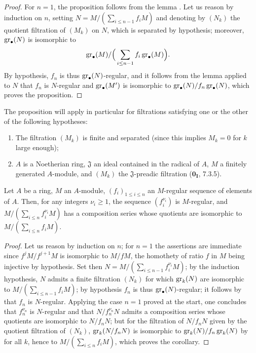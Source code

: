 \begin{proof}
For $n=1$, the proposition follows from the lemma .
Let us reason by induction on $n$, setting $N=M/(\sum_{i\leq n-1}f_iM)$ and denoting by $(N_k)$ the quotient filtration of $(M_k)$ on $N$, which is separated by hypothesis;
moreover, $\operatorname{gr}_\bullet(N)$ is isomorphic to
\[
  \operatorname{gr}_\bullet(M)/\Big(\sum_{i\leq n-1}f_i\operatorname{gr}_\bullet(M)\Big).
\]
By hypothesis, $f_n$ is thus $\operatorname{gr}_\bullet(N)$-regular, and it follows from the lemma  applied to $N$ that $f_n$ is $N$-regular and $\operatorname{gr}_\bullet(M')$ is isomorphic to $\operatorname{gr}_\bullet(N)/f_n\operatorname{gr}_\bullet(N)$, which proves the proposition.
\end{proof}

The proposition  will apply in particular for filtrations satisfying one or the other of the following hypotheses:
\begin{enumerate}
  \item[$1^\circ$] The filtration $(M_k)$ is finite and separated (since this implies $M_k=0$ for $k$ large enough);
  \item[$2^\circ$] $A$ is a Noetherian ring, $\mathfrak{J}$ an ideal contained in the radical of $A$, $M$ a finitely generated $A$-module, and $(M_k)$ the $\mathfrak{J}$-preadic filtration ($\mathbf{0_I}$, 7.3.5).
\end{enumerate}

\begin{corollary}[15.1.20]
\label{0.15.1.20}
Let $A$ be a ring, $M$ an $A$-module, $(f_i)_{1\leq i\leq n}$ an $M$-regular sequence of elements of $A$.
Then, for any integers $\nu_i\geq 1$, the sequence $(f_i^{\nu_i})$ is $M$-regular, and $M/(\sum_{i\leq n}f_i^{\nu_i}M)$ has a composition series whose quotients are isomorphic to $M/(\sum_{i\leq n}f_iM)$.
\end{corollary}

\begin{proof}
Let us reason by induction on $n$;
for $n=1$ the assertions are immediate since $f^jM/f^{j+1}M$ is isomorphic to $M/fM$, the homothety of ratio $f$ in $M$ being injective by hypothesis.
Set then $N=M/(\sum_{i\leq n-1}f_i^{\nu_i}M)$;
by the induction hypothesis, $N$ admits a finite filtration $(N_k)$ for which $\operatorname{gr}_k(N)$ are isomorphic to $M/(\sum_{i\leq n-1}f_iM)$;
by hypothesis $f_n$ is thus $\operatorname{gr}_\bullet(N)$-regular;
it follows by  that $f_n$ is $N$-regular.
Applying the case $n=1$ proved at the start, one concludes that $f_n^{\nu_n}$ is $N$-regular and that $N/f_n^{\nu_n}N$ admits a composition series whose quotients are isomorphic to $N/f_nN$;
but for the filtration of $N/f_nN$ given by the quotient filtration of $(N_k)$, $\operatorname{gr}_k(N/f_nN)$ is isomorphic to $\operatorname{gr}_k(N)/f_n\operatorname{gr}_k(N)$ by  for all $k$, hence to $M/(\sum_{i\leq n}f_iM)$, which proves the corollary.
\end{proof}

